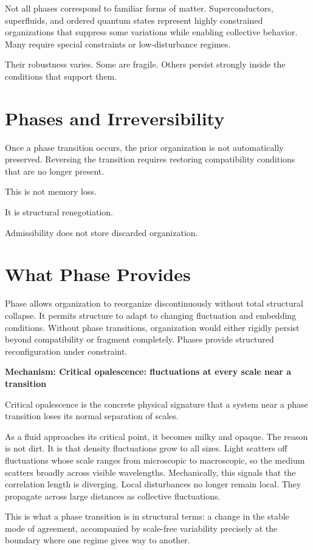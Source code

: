 \documentclass[11pt,twoside,openright]{book}
\newenvironment{mechanismbox}[1]
  {\begin{framed}\noindent\textbf{Mechanism: #1}\par\medskip}
  {\end{framed}}
\begin{document}
Not all phases correspond to familiar forms of matter. Superconductors, superfluids, and ordered quantum states represent highly constrained organizations that suppress some variations while enabling collective behavior. Many require special constraints or low-disturbance regimes.

Their robustness varies.
Some are fragile.
Others persist strongly inside the conditions that support them.
\section*{Phases and Irreversibility}

Once a phase transition occurs, the prior organization is not automatically preserved. Reversing the transition requires restoring compatibility conditions that are no longer present.

This is not memory loss.

It is structural renegotiation.

Admissibility does not store discarded organization.
\section*{What Phase Provides}

Phase allows organization to reorganize discontinuously without total structural collapse. It permits structure to adapt to changing fluctuation and embedding conditions. Without phase transitions, organization would either rigidly persist beyond compatibility or fragment completely. Phases provide structured reconfiguration under constraint.

\begin{mechanismbox}{Critical opalescence: fluctuations at every scale near a transition}
Critical opalescence is the concrete physical signature that a system near a phase transition loses its normal separation of scales.

As a fluid approaches its critical point, it becomes milky and opaque. The reason is not dirt. It is that density fluctuations grow to all sizes. Light scatters off fluctuations whose scale ranges from microscopic to macroscopic, so the medium scatters broadly across visible wavelengths. Mechanically, this signals that the correlation length is diverging. Local disturbances no longer remain local. They propagate across large distances as collective fluctuations.

This is what a phase transition is in structural terms:
a change in the stable mode of agreement, accompanied by scale-free variability precisely at the boundary where one regime gives way to another.
\end{mechanismbox}
\end{document}
